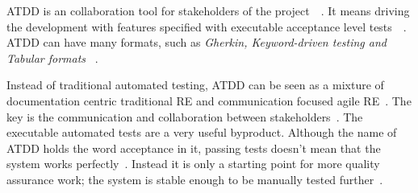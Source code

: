     ATDD is an collaboration tool for stakeholders of the project~\cite{gartner2012atdd}~\cite{haugset2012automated}. It means driving the
    development with features specified with executable acceptance level tests~\cite{gartner2012atdd}~\cite{haugset2012automated}.
    ATDD can have many formats, such as \textit{Gherkin, Keyword-driven testing and Tabular formats} ~\cite{gartner2012atdd}.

    Instead of traditional automated testing, ATDD can be seen as a mixture of documentation centric traditional RE and communication focused agile RE~\cite{haugset2012automated}.
    The key is the communication and collaboration between stakeholders~\cite{haugset2012automated}. The executable automated tests are a very useful byproduct.
    Although the name of ATDD holds the word acceptance in it, passing tests doesn't mean that the system works perfectly~\cite{gartner2012atdd}. Instead it is
    only a starting point for more quality assurance work; the system is stable enough to be manually tested further~\cite{acceptance2010}.

